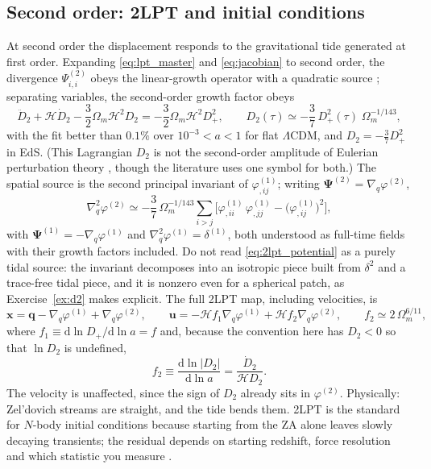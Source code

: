 \documentclass[a4paper,11pt]{article}
\newcommand{\vx}{\bm{x}}
\newcommand{\vq}{\bm{q}}
\newcommand{\vu}{\bm{u}}
\newcommand{\vPsi}{\bm{\Psi}}
\def\cH{\mathcal{H}}
\newcommand{\dd}{\mathrm{d}}
\def\lcdm{$\Lambda$CDM}
\def\Om{\Omega_m}
\numberwithin{equation}{section}
\begin{document}
\subsection{Second order: 2LPT and initial conditions}
\label{sec:2lpt}

At second order the displacement responds to the gravitational tide generated at first order. Expanding \eqref{eq:lpt_master} and \eqref{eq:jacobian} to second order, the divergence $\Psi^{(2)}_{i,i}$ obeys the linear-growth operator with a quadratic source \cite[Eqs.~(E.30)--(E.31)]{Jeong2010}; separating variables, the second-order growth factor obeys
\begin{equation}
\ddot D_2 + \cH\dot D_2 - \frac{3}{2}\Om\cH^2 D_2
= -\frac{3}{2}\Om\cH^2 D_+^2 ,
\qquad
D_2(\tau) \simeq -\frac{3}{7}\,D_+^2(\tau)\;\Om^{-1/143},
\label{eq:D2}
\end{equation}
with the fit better than $0.1\%$ over $10^{-3}<a<1$ for flat \lcdm{}, and
$D_2 = -\tfrac37 D_+^2$ in EdS. (This Lagrangian $D_2$ is not the second-order
amplitude of Eulerian perturbation theory \cite{EFTnotes}, though the literature
uses one symbol for both.) The spatial source is the second principal invariant
of $\varphi^{(1)}_{,ij}$; writing $\vPsi^{(2)} = \nabla_q\varphi^{(2)}$,
\begin{equation}
\nabla_q^2\varphi^{(2)}
\simeq -\frac{3}{7}\,\Om^{-1/143}
\sum_{i>j}\Big[\varphi^{(1)}_{,ii}\,\varphi^{(1)}_{,jj} - \big(\varphi^{(1)}_{,ij}\big)^2\Big],
\label{eq:2lpt_potential}
\end{equation}
with $\vPsi^{(1)} = -\nabla_q\varphi^{(1)}$ and $\nabla^2_q\varphi^{(1)} = \delta^{(1)}$, both understood as full-time fields with their growth factors included. Do not read \eqref{eq:2lpt_potential} as a purely tidal source: the invariant decomposes into an isotropic piece built from $\delta^2$ and a trace-free tidal piece, and it is nonzero even for a spherical patch, as Exercise~\ref{ex:d2} makes explicit. The full 2LPT map, including velocities, is
\begin{equation}
\vx = \vq - \nabla_q\varphi^{(1)} + \nabla_q\varphi^{(2)},
\qquad
\vu = -\cH f_1 \nabla_q\varphi^{(1)} + \cH f_2\nabla_q\varphi^{(2)},
\qquad
f_2 \simeq 2\,\Om^{6/11} ,
\label{eq:2lpt_map}
\end{equation}
where $f_1 \equiv \dd\ln D_+/\dd\ln a = f$ and, because the convention here has $D_2<0$ so that $\ln D_2$ is undefined,
\begin{equation}
f_2 \equiv \frac{\dd\ln|D_2|}{\dd\ln a} = \frac{\dot D_2}{\cH D_2} .
\label{eq:f2_def}
\end{equation}
The velocity is unaffected, since the sign of $D_2$ already sits in
$\varphi^{(2)}$. Physically: Zel'dovich streams are straight, and the tide bends
them. 2LPT is the standard for $N$-body initial conditions because starting from
the ZA alone leaves slowly decaying transients; the residual depends on starting
redshift, force resolution and which statistic you measure
\cite[App.~E.5]{Jeong2010}.
\end{document}
